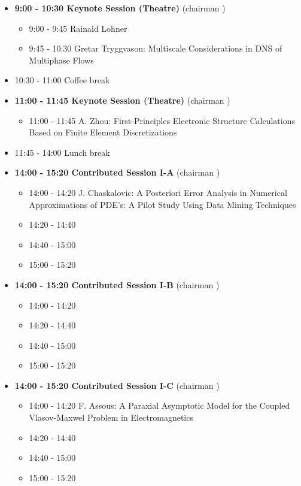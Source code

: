 \documentclass[10pt, A4]{article}%
\begin{document}
\begin{itemize}    
  \item {\bf 9:00 - 10:30 Keynote Session (Theatre)} (chairman ) 
  \begin{itemize}
    \item 9:00 - 9:45 Rainald Lohner
    \item 9:45 - 10:30 {Gretar Tryggvason}: {Multiscale Considerations in DNS of Multiphase Flows}
  \end{itemize}
  \item 10:30 - 11:00 Coffee break
  \item {\bf 11:00 - 11:45 Keynote Session (Theatre)} (chairman ) 
  \begin{itemize}
    \item 11:00 - 11:45 {A. Zhou}: {First-Principles Electronic Structure Calculations Based on Finite Element Discretizations}
  \end{itemize}
  \item 11:45 - 14:00 Lunch break      
  \item {\bf 14:00 - 15:20 Contributed Session I-A} (chairman ) 
  \begin{itemize}
    \item 14:00 - 14:20 {J. Chaskalovic}: {A Posteriori Error Analysis in Numerical Approximations of PDE's: A Pilot Study Using Data Mining Techniques}
    \item 14:20 - 14:40 
    \item 14:40 - 15:00 
    \item 15:00 - 15:20 
  \end{itemize}
  \item {\bf 14:00 - 15:20 Contributed Session I-B} (chairman ) 
  \begin{itemize}
    \item 14:00 - 14:20 
    \item 14:20 - 14:40 
    \item 14:40 - 15:00 
    \item 15:00 - 15:20 
  \end{itemize}
    \item {\bf 14:00 - 15:20 Contributed Session I-C} (chairman ) 
  \begin{itemize}
    \item 14:00 - 14:20 {F. Assous}: {A Paraxial Asymptotic Model for the Coupled Vlasov-Maxwel Problem in Electromagnetics}
    \item 14:20 - 14:40 
    \item 14:40 - 15:00 
    \item 15:00 - 15:20 

\end{itemize}
\end{itemize}
\end{document}
